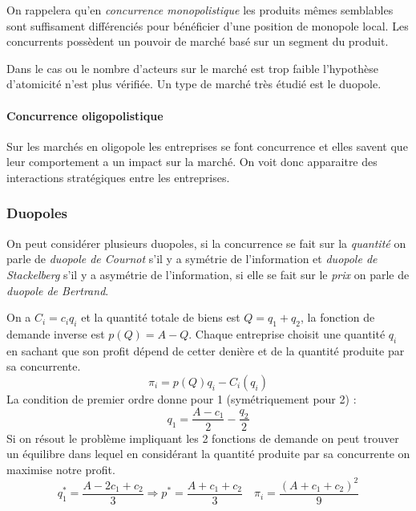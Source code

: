 On rappelera qu'en \emph{concurrence monopolistique} les produits mêmes semblables sont suffisament 
différenciés pour bénéficier d'une position de monopole local. 
Les concurrents possèdent un pouvoir de marché basé sur un segment du produit.

Dans le cas ou le nombre d'acteurs sur le marché est trop faible l'hypothèse d'atomicité n'est plus vérifiée.
Un type de marché très étudié est le duopole. 

\paragraph{Concurrence oligopolistique} %
\label{par:concurrence_oligopolistique}
Sur les marchés en oligopole les entreprises se font concurrence et elles savent que leur comportement a un impact sur la marché. On voit donc apparaitre des interactions stratégiques entre les entreprises.

\subsubsection{Duopoles} %
\label{sub:duopoles}

On peut considérer plusieurs duopoles, si la concurrence se fait sur la \emph{quantité} 
on parle de \emph{duopole de Cournot} s'il y a symétrie de l'information
et \emph{duopole de Stackelberg} s'il y a asymétrie de l'information, 
si elle se fait sur le \emph{prix} on parle de \emph{duopole de Bertrand}.

\begin{tcolorbox}[title=Duopole de Cournot]
	
	On a $C_i=c_iq_i$ et la quantité totale de biens est $Q=q_1+q_2$, la fonction de demande inverse est $p(Q)=A-Q$.
	Chaque entreprise choisit une quantité $q_i$ en sachant que son profit dépend de cetter denière et de la quantité produite par sa concurrente.
	\[
		\pi_i = p(Q)q_i-C_i(q_i)
	\]
	La condition de premier ordre donne pour 1 (symétriquement pour 2) :
	\[
		q_1 = \frac{A-c_1}{2}-\frac{q_2}{2}
	\]
	Si on résout le problème impliquant les 2 fonctions de demande on peut trouver un équilibre dans lequel en considérant la quantité produite par sa concurrente on maximise notre profit.
	\[
		q_1^* = \frac{A-2c_1+c_2}{3} \Rightarrow p^* = \frac{A+c_1+c_2}{3} \quad \pi_i= \frac{(A+c_1+c_2)^2}{9}
	\]
	
\end{tcolorbox}

